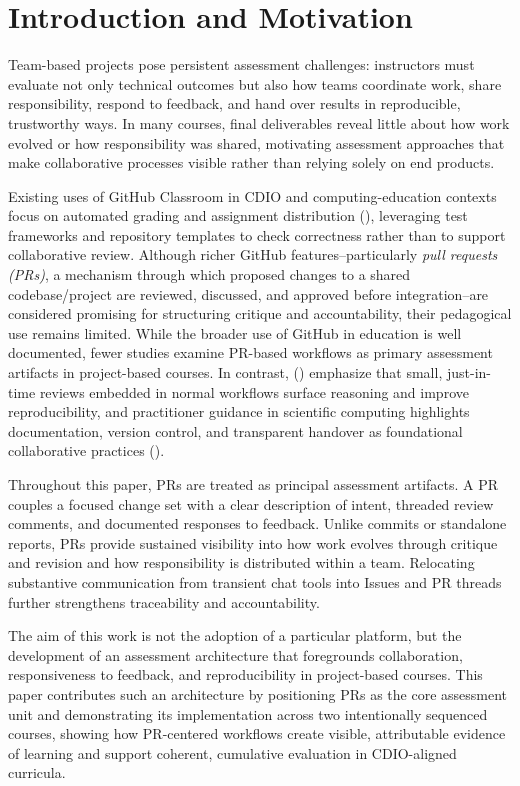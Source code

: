 \section{Introduction and Motivation}
Team-based projects pose persistent assessment challenges: instructors must evaluate not only technical outcomes but also how teams coordinate work, share responsibility, respond to feedback, and hand over results in reproducible, trustworthy ways. In many courses, final deliverables reveal little about how work evolved or how responsibility was shared, motivating assessment approaches that make collaborative processes visible rather than relying solely on end products.

Existing uses of GitHub Classroom in CDIO and computing-education contexts focus on automated grading and assignment distribution (\cite{githubsurvey}), leveraging test frameworks and repository templates to check correctness rather than to support collaborative review. 
Although richer GitHub features--particularly \textit{pull requests (PRs)}, a mechanism through which proposed changes to a shared codebase/project are reviewed, discussed, and approved before integration--are considered promising for structuring critique and accountability, their pedagogical use remains limited.
While the broader use of GitHub in education is well documented, fewer studies examine PR-based workflows as primary assessment artifacts in project-based courses.
In contrast, \citeauthor{PetreWilson2014WSSSPE} (\citeyear{PetreWilson2014WSSSPE}) emphasize that small, just-in-time reviews embedded in normal workflows surface reasoning and improve reproducibility, and practitioner guidance in scientific computing highlights documentation, version control, and transparent handover as foundational collaborative practices (\cite{Wilson2017GoodEnough}).

Throughout this paper, PRs are treated as principal assessment artifacts. A PR couples a focused change set with a clear description of intent, threaded review comments, and documented responses to feedback. Unlike commits or standalone reports, PRs provide sustained visibility into how work evolves through critique and revision and how responsibility is distributed within a team. Relocating substantive communication from transient chat tools into Issues and PR threads further strengthens traceability and accountability.

The aim of this work is not the adoption of a particular platform, but the development of an assessment architecture that foregrounds collaboration, responsiveness to feedback, and reproducibility in project-based courses. This paper contributes such an architecture by positioning PRs as the core assessment unit and demonstrating its implementation across two intentionally sequenced courses, showing how PR-centered workflows create visible, attributable evidence of learning and support coherent, cumulative evaluation in CDIO-aligned curricula.

